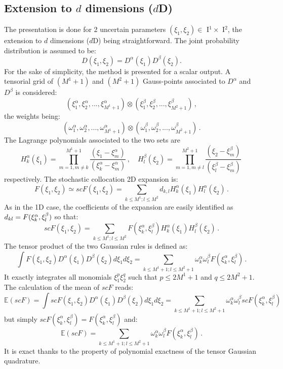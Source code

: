 \documentclass{eurosae}
\def\Ir{{\textrm I}}
\newcommand{\esp}{{\mathbb E}}
\begin{document}
\subsection{Extension to $d$ dimensions ($d$D)}
%
The presentation is done for  2 uncertain parameters  $(\xi_1,\xi_2) \in$ \Ir$^1 \times$ \Ir$^2 $, the extension to $d$ dimensions ($d$D) being straightforward. 
The joint probability distribution is assumed to be:
%
                   $$ D(\xi_1,\xi_2) = D^{\alpha}(\xi_1)D^{\beta}(\xi_2).$$ 
%
For the sake of simplicity, the method is presented for a scalar output. A tensorial grid of $(M^1+1)$ and $(M^2+1)$ Gauss-points associated to $D^{\alpha}$ and $D^{\beta}$ is considered: 
 $$  (\xi^\alpha_1, \xi^\alpha_2,...,\xi^\alpha_{M^1+1})\otimes(\xi^\beta_1, \xi^\beta_2,...,\xi^\beta_{M^2+1})\,,  $$
 the weights being: 
%
 $$    (\omega^\alpha_1, \omega^\alpha_2,...,\omega^\alpha_{M^1+1})\otimes(\omega^\beta_1, \omega^\beta_2,...,\omega^\beta_{M^2+1})\,.$$ 
%
 The Lagrange polynomials associated to the two sets are
% 
  $$   H_k^\alpha(\xi_1) = \prod_{m=1, m\neq k}^{M^1+1} \displaystyle\frac{(\xi_1-\xi^\alpha_m)}{(\xi^\alpha_k-\xi^\alpha_m)}\,,\quad H_l^\beta(\xi_2) = \prod_{m=1, m\neq l}^{M^2+1} \displaystyle\frac{(\xi_2-\xi^\beta_m)}{(\xi^\beta_l-\xi^\beta_m)}\,        $$
%
respectively. The stochastic collocation 2D expansion is:
  $$  F(\xi_1,\xi_2)\simeq scF(\xi_1,\xi_2)  = \sum_{k \leq M^1 ; l\leq M^2} d_{k,l}  H_k^\alpha(\xi_1) H_l^\alpha(\xi_2)\,.      $$
%
As in the 1D case, the coefficients of the expansion are easily identified as $\smash{d_{kl}}=F(\xi^\alpha_k,\xi^\beta_l)$ so that:
  $$  scF(\xi_1,\xi_2)  = \sum_{k \leq M^1 ; l\leq M^2}  F(\xi^\alpha_k,\xi^\beta_l) H_k^\alpha(\xi_1) H_l^\beta(\xi_2)\,.     $$  
%
 The tensor product of the two Gaussian rules is defined as:
%
    $$ \int  F(\xi_1,\xi_2) D^\alpha(\xi_1) D^\beta(\xi_2) d\xi_1 d\xi_2 = \sum_{k \leq M^1+1 ; l\leq M^2+1} \omega^\alpha_k \omega^\beta_l F(\xi^\alpha_k,\xi^\beta_l)\,. $$
%
 It exactly integrates  all monomials $ \xi_ 1^p   \xi_ 2^q $ such that  $p \leq 2M^1 +1$ and  $q \leq 2M^2 +1$.  
 The calculation of the mean of $scF$ reads:  
   $$   \esp(scF) =\int  scF(\xi_1,\xi_2) D^\alpha(\xi_1) D^\beta(\xi_2) d\xi_1 d\xi_2 =  \sum_{k \leq M^1+1 ; l\leq M^2+1} \omega^\alpha_k \omega^\beta_l scF(\xi^\alpha_k,\xi^\beta_l)\,   $$
%
 but simply $scF(\xi^\alpha_k,\xi^\beta_l) = F(\xi^\alpha_k,\xi^\beta_l)$ and:
%
   $$  \esp(scF) =  \sum_{k \leq M^1+1 ; l\leq M^2+1} \omega^\alpha_k \omega^\beta_l F(\xi^\alpha_k,\xi^\beta_l)\,.   $$
%
 It is exact thanks to the property of polynomial exactness of the tensor Gaussian quadrature.
 
\end{document}
